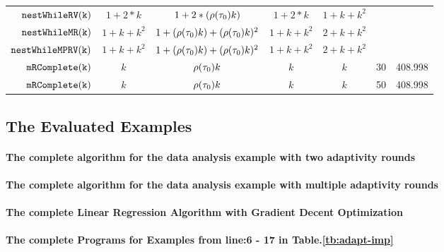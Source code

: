 \begin {table}[H]
\begin{center}
{\begin{tabular}{ r | c | c | c | c | c | c }
         $  \mathtt{nestWhileRV(k)}$ & $1 + 2*k$ & $1 + 2*(\rho(\mathtt{\tau}_0) k)$ & $1 + 2*k$ &  $1 + k + k^2$   &    \\
         $  \mathtt{nestWhileMR(k)}$ & $1 + k + k^2$ & $1 + (\rho(\mathtt{\tau}_0) k) + (\rho(\mathtt{\tau}_0) k)^2$  & $1 + k + k^2$ &  $2 + k + k^2$  &    \\
         $  \mathtt{nestWhileMPRV(k)}$ & $1 + k + k^2$ & $1 + (\rho(\mathtt{\tau}_0) k) + (\rho(\mathtt{\tau}_0) k)^2$  & $1 + k + k^2$ &  $2 + k + k^2$  &    \\
         $  \mathtt{mRComplete(k)}$ & $k$ & $ \rho(\mathtt{\tau}_0) k $ & $k$ & $k$  &  30 & 408.998 \\
         $  \mathtt{mRComplete(k)}$ & $k$ & $ \rho(\mathtt{\tau}_0) k $ & $k$ & $k$  &  50 & 408.998
        \end{tabular}
}        
\end{center}
\end{table}
%
 \subsection{The Evaluated Examples}  
 \paragraph{The complete algorithm for the data analysis example with two adaptivity rounds} 
 
 \paragraph{The complete algorithm for the data analysis example with multiple adaptivity rounds} 
 
\paragraph{The complete Linear Regression Algorithm with Gradient Decent Optimization}

\paragraph*{The complete Programs for Examples from line:6 - 17 in Table.\ref{tb:adapt-imp}}
